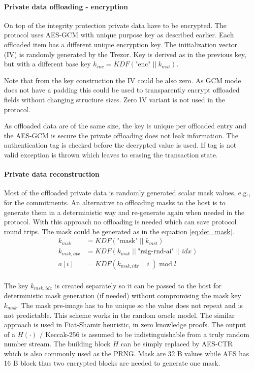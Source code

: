 \documentclass[]{article}
\begin{document}
\paragraph{Private data offloading - encryption}
On top of the integrity protection private data have to be encrypted.
The protocol uses AES-GCM with unique purpose key as described earlier. Each offloaded item has a different unique encryption key.
The initialization vector (IV) is randomly generated by the Trezor. Key is derived as in the previous key, but with a different base key $k_{enc} = \textit{KDF}\left(\text{"enc"} \; || \; k_{mst}\right)$.

Note that from the key construction the IV could be also zero. As GCM mode does not have a padding this could be used to transparently encrypt offloaded fields without changing structure sizes. Zero IV variant is not used in the protocol.

As offloaded data are of the same size, the key is unique per offloaded entry and the AES-GCM is secure the private offloading does not leak information. The authentication tag is checked before the decrypted value is used. If tag is not valid exception is thrown which leaves to erasing the transaction state.

\paragraph{Private data reconstruction} \label{mask_reconstruction}
Most of the offloaded private data is randomly generated scalar mask values, e.g., for the commitments. An alternative to offloading masks to the host is to generate them in a deterministic way and re-generate again when needed in the protocol. With this approach no offloading is needed which can save protocol round trips. The mask could be generated as in the equation \ref{eq:det_mask}. 
\begin{equation}
\begin{split} \label{eq:det_mask}
k_{msk} &= \textit{KDF}\left(\text{"mask"} \; || \; k_{mst}\right)\\
k_{msk,idx} &= \textit{KDF}\left(k_{msk} \; || \; \text{"rsig-rnd-ai"} \; || \; idx \right)\\
a[i] &= KDF(k_{msk,idx} \; || \; i \;) \; \text{mod} \; l  \\
\end{split}
\end{equation}

The key $k_{msk,idx}$ is created separately so it can be passed to the host for deterministic mask generation (if needed) without compromising the mask key $k_{msk}$.
The mask pre-image has to be unique so the value does not repeat and is not predictable. This scheme works in the random oracle model. The similar approach is used in Fiat-Shamir heuristic, in zero knowledge proofs. The output of a $H(\cdot)$ / Keccak-256 is assumed to be indistinguishable from a truly random number stream. The building block $H$ can be simply replaced by AES-CTR which is also commonly used as the PRNG. Mask are 32 B values while AES has 16 B block thus two encrypted blocks are needed to generate one mask. 
\end{document}
